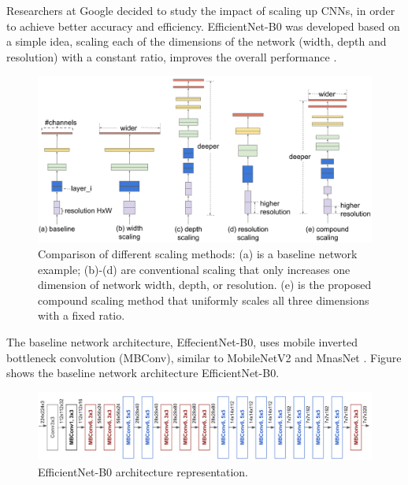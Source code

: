 \par Researchers at Google decided to study the impact of scaling up CNNs, in order to achieve better accuracy and efficiency. EfficientNet-B0 was developed based on a simple idea, scaling each of the dimensions of the network (width, depth and resolution) with a constant ratio, improves the overall performance \cite{tan2019efficientnet}.

\begin{figure}[htb]
    \centering
    \includegraphics[scale = 0.25]{Sections/2StateOfTheArt/2_images/efficientNet_scale.png}
    \caption{Comparison of different scaling methods:  (a) is a baseline network example; (b)-(d) are conventional scaling that only increases one dimension of network  width, depth, or resolution. (e) is the proposed compound scaling method that uniformly scales all three dimensions with a fixed ratio. \cite{tan2019efficientnet}
    } 

\end{figure}

\newpage

\par The baseline network architecture, EffecientNet-B0, uses mobile inverted bottleneck convolution (MBConv), similar to MobileNetV2 \cite{s2018mobilenetv2} and MnasNet \cite{tan2018mnasnet}. Figure  shows the baseline network architecture EfficientNet-B0.

\begin{figure}[htb]
    \centering
    \includegraphics[scale = 0.22]{Sections/2StateOfTheArt/2_images/efficientNet_Arch.png}
    \caption{EfficientNet-B0 architecture representation.} 

\end{figure}